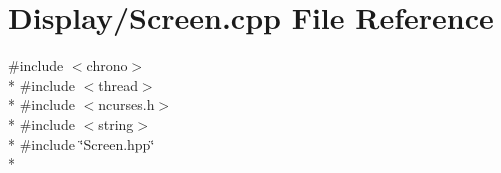 \section{Display/\-Screen.cpp File Reference}
\label{_screen_8cpp}
{\ttfamily \#include $<$chrono$>$}\\*
{\ttfamily \#include $<$thread$>$}\\*
{\ttfamily \#include $<$ncurses.\-h$>$}\\*
{\ttfamily \#include $<$string$>$}\\*
{\ttfamily \#include \char`\"{}Screen.\-hpp\char`\"{}}\\*
